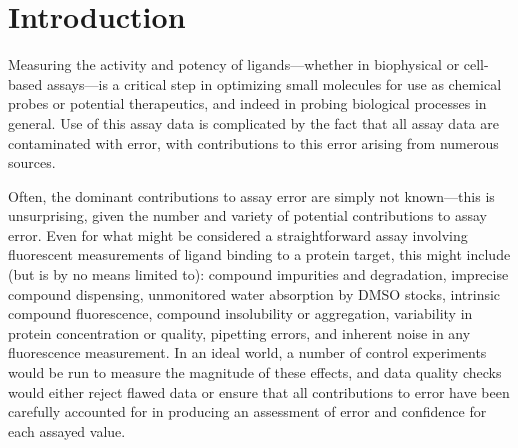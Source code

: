 \documentclass[aps,pre,twocolumn,nofootinbib,superscriptaddress,linenumbers]{revtex4-1}
\begin{document}
\section{Introduction}
\label{section:introduction}

Measuring the activity and potency of ligands---whether in biophysical or cell-based assays---is a critical step in optimizing small molecules for use as chemical probes or potential therapeutics, and indeed in probing biological processes in general.
Use of this assay data is complicated by the fact that all assay data are contaminated with error, with contributions to this error arising from numerous sources.

Often, the dominant contributions to assay error are simply not known---this is unsurprising, given the number and variety of potential contributions to assay error.
Even for what might be considered a straightforward assay involving fluorescent measurements of ligand binding to a protein target, this might include (but is by no means limited to): compound impurities and degradation, imprecise compound dispensing, unmonitored water absorption by DMSO stocks, intrinsic compound fluorescence, compound insolubility or aggregation, variability in protein concentration or quality, pipetting errors, and inherent noise in any fluorescence measurement. 
In an ideal world, a number of control experiments would be run to measure the magnitude of these effects, and data quality checks would either reject flawed data or ensure that all contributions to error have been carefully accounted for in producing an assessment of error and confidence for each assayed value.

\end{document}

